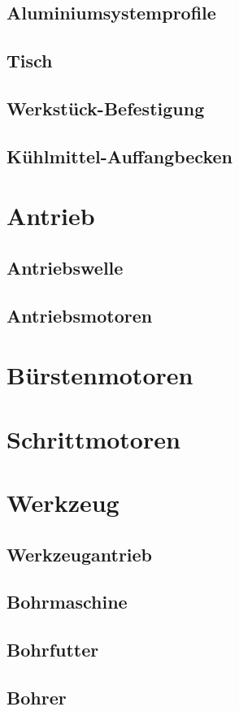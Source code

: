 \documentclass[
	a4paper,
	smallheadings,
	german,
	]
	{scrreprt}
\begin{document}
	\subsection{Aluminiumsystemprofile}
	\subsection{Tisch}
	\subsection{Werkstück-Befestigung}
	\subsection{Kühlmittel-Auffangbecken}
\section{Antrieb}
	\subsection{Antriebswelle}
	\subsection{Antriebsmotoren}
		\section{Bürstenmotoren}
		\section{Schrittmotoren}
\section{Werkzeug}
	\subsection{Werkzeugantrieb}
	\subsection{Bohrmaschine}
		\subsection{Bohrfutter}
		\subsection{Bohrer}
\end{document}
